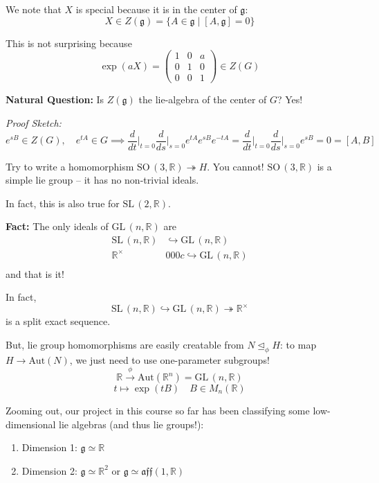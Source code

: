 \documentclass[12pt]{article}
\newcommand{\R}{\mathbb{R}}
\newcommand{\SL}{\text{SL}\,}
\newcommand{\SO}{\text{SO}\,}
\newcommand{\GL}{\text{GL}\,}
\newcommand{\g}{\mathfrak{g}}
\begin{document}
    We note that $X$ is special because it is in the center of $\g$: 
    \[X \in Z(\g) = \{A \in \g \; | \; [A, \g] = 0\}\]

    This is not surprising because 
    \[\exp(aX) = \begin{pmatrix}
        1 & 0 & a\\ 
        0 & 1 & 0\\ 
        0 & 0 & 1
    \end{pmatrix} \in Z(G)\] 

    \textbf{Natural Question:} Is $Z(\g)$ the lie-algebra of the center of $G$? Yes! 

    \emph{Proof Sketch:} 
    \[e^{sB} \in Z(G), \quad e^{tA} \in G \implies \frac{d}{dt}\bigg\vert_{t=0} \frac{d}{ds}\bigg\vert_{s=0} e^{tA} e^{sB} e^{-tA} = \frac{d}{dt}\bigg\vert_{t=0} \frac{d}{ds}\bigg\vert_{s=0} e^{sB} = 0 = [A, B]\] 

   Try to write a homomorphism $\SO(3, \R) \twoheadrightarrow H$. You cannot! $\SO(3, \R)$ is a simple lie group -- it has no non-trivial ideals. 

   In fact, this is also true for $\SL(2, \R)$. 

   \textbf{Fact:} The only ideals of $\GL(n, \R)$ are 
   \begin{align*}
        \SL(n, \R) &\hookrightarrow \GL(n, \R)\\
        \R^{\times} &0 0 0c\hookrightarrow \GL(n, \R)\\
   \end{align*}
   and that is it! 

   In fact, 
   \[\SL(n, \R) \hookrightarrow \GL(n, \R) \twoheadrightarrow \R^{\times}\]
   is a split exact sequence. 

   But, lie group homomorphisms are easily creatable from $N \trianglelefteq_{\phi} H$: to map $H \to \text{Aut}(N)$, we just need to use one-parameter subgroups!
   \[\R \overset{\phi}{\to} \text{Aut}(\R^n) = \GL(n, \R)\]
   \[t \mapsto \exp(tB) \quad B \in M_n(\R)\]

   Zooming out, our project in this course so far has been classifying some low-dimensional lie algebras (and thus lie groups!): 

   \begin{enumerate}
        \item Dimension 1: $\g \simeq \R$ 
        \item Dimension 2: $\g \simeq \R^2$ or $\g \simeq \mathfrak{aff}(1, \R)$
   \end{enumerate}
\end{document}
